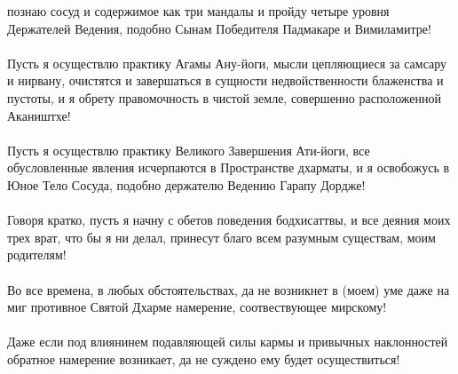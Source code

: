 познаю сосуд и содержимое как три мандалы и пройду четыре
уровня Держателей Ведения, подобно Сынам Победителя
Падмакаре и Вимиламитре!\\
\\
Пусть я осуществлю практику Агамы Ану-йоги, мысли
цепляю\-щиеся за самсару и нирвану, очистятся и завершаться
в сущности недвойственности блаженства и пустоты,
и я обрету правомочность в чистой земле, совершенно расположенной Акаништхе!\\
\\
Пусть я осуществлю практику Великого Завершения Ати-йоги,
все обусловленные явления исчерпаются в Пространстве дхарматы,
и я освобожусь в Юное Тело Сосуда, подобно держателю Ведению Гарапу Дордже!\\
\\
Говоря кратко, пусть я начну с обетов поведения бодхисаттвы,
и все деяния моих трех врат, что бы я ни делал,
принесут благо всем разумным существам, моим родителям!\\
\\
Во все времена, в любых обстоятельствах, да не возникнет
в (моем) уме даже на миг противное Святой Дхарме намерение, соотвествующее мирскому!\\
\\
Даже если под влиянинем подавляющей силы кармы и привыч\-ных наклонностей 
обратное намерение возникает, да не сужде\-но ему будет осуществиться!\\

